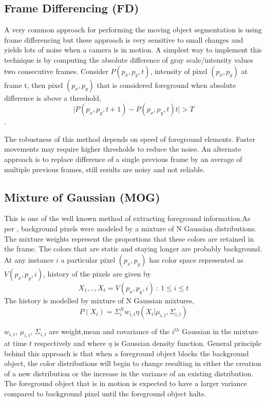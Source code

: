 \subsection{Frame Differencing (FD)}
A very common approach for performing the moving object segmentation is using frame differencing but these approach is very sensitive to small changes and yields lots of noise when a camera is in motion. A simplest way to implement this technique is by computing the absolute difference of gray scale/intensity values two consecutive frames. Consider $P(p_x,p_y,t)$, intensity of pixel $(p_x,p_y)$ at frame t, then pixel $(p_x,p_y)$ that is considered foreground when absolute difference is above a threshold,$$\vert P(p_x,p_y,t+1) - P(p_x,p_y,t)t\vert > T$$.
\par The robustness of this method depends on speed of foreground elements. Faster movements may require higher thresholds to reduce the noise.  An alternate approach is to replace difference of a single previous frame  by an average of multiple previous frames, still results are noisy and not reliable.

\subsection{Mixture of Gaussian (MOG)}
This is one of the well known method of extracting foreground information.As per \cite{kaew}, background pixels were modeled by a mixture of N Gaussian distributions. The mixture weights represent the proportions that these colors are retained in the frame. The colors that are static and staying longer are probably background. At any instance $i$ a particular pixel $(p_x,p_y)$ has color space represented as $V(p_{x},p_{y},i)$, history of the pixels are given by 
$$X_{1},..,X_{t} = {V(p_{x},p_{y},i)~:~1\le i \le t }$$
The history is modelled by mixture of N Gaussian mixtures,
$$P(X_{t})=\Sigma_{i}^{N}w_{i,t}\eta(X_{t}|\mu_{i,t},\Sigma_{i,t})$$
\par $w_{i,t}$, $\mu_{i,t}$, $\Sigma_{i,t}$ are weight,mean and covariance of the $i^{th}$ Gaussian in the mixture at time $t$ respectively and where $\eta$ is Gaussian density function. General principle behind this approach is that when a foreground object blocks the background object, the color distributions will begin to change resulting in either the creation of a new distribution or the increase in the variance of an existing distribution. The foreground object that is in motion is expected to have a larger variance compared to background pixel until the foreground object halts.


